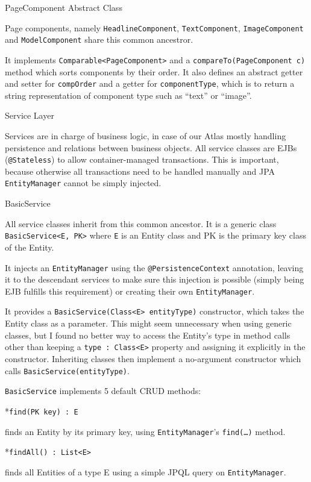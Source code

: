 \secc PageComponent Abstract Class

Page components, namely {\tt HeadlineComponent}, {\tt TextComponent}, {\tt ImageComponent} and {\tt ModelComponent} share 
this common ancestror.

It implements {\tt Comparable<PageComponent>} and a {\tt compareTo(PageComponent c)} method which sorts components by their order. It also defines an abstract getter and setter for {\tt compOrder} and a getter for {\tt componentType}, which is to return a string representation of component type such as “text” or “image”.

\sec Service Layer

Services are in charge of business logic, in case of our Atlas mostly handling persistence and relations between business objects. All service classes are EJBs ({\tt @Stateless}) to allow container-managed transactions. This is important, because otherwise all transactions need to be handled manually and JPA {\tt EntityManager} cannot be simply injected.

\secc BasicService

All service classes inherit from this common ancestor. It is a generic class {\tt BasicService<E, PK>} where {\tt E} is an Entity class and PK is the primary key class of the Entity.

It injects an {\tt EntityManager} using the {\tt @PersistenceContext} annotation, leaving it to the descendant services to make sure this injection is possible (simply being EJB fulfills this requirement) or creating their own {\tt EntityManager}.

It provides a {\tt BasicService(Class<E> entityType)} constructor, which takes the Entity class as a parameter. This might seem unnecessary when using generic classes, but I found no better way to access the Entity’s type in method calls other than keeping a {\tt type : Class<E>} property and assigning it explicitly in the constructor. Inheriting classes then implement a no-argument constructor which calls {\tt BasicService(entityType)}.

{\tt BasicService} implements 5 default CRUD methods:

\begitems

*{\tt find(PK key) : E}

finds an Entity by its primary key, using {\tt EntityManager}’s {\tt find(…)} method.

*{\tt findAll() : List<E>}

finds all Entities of a type {E} using a simple JPQL query on {\tt EntityManager}.

